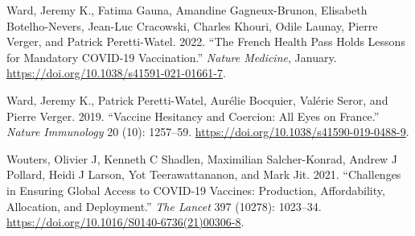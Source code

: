 \documentclass[
]{article}
\newlength{\cslhangindent}
\newlength{\cslentryspacingunit} %
\newenvironment{CSLReferences}[2] %
 {%
  \setlength{\parindent}{0pt}
  \ifodd #1
  \let\oldpar\par
  \def\par{\hangindent=\cslhangindent\oldpar}
  \fi
  \setlength{\parskip}{#2\cslentryspacingunit}
 }%
 {}
\begin{document}
\begin{CSLReferences}{1}{0}
\leavevmode{}%
Ward, Jeremy K., Fatima Gauna, Amandine Gagneux-Brunon, Elisabeth Botelho-Nevers, Jean-Luc Cracowski, Charles Khouri, Odile Launay, Pierre Verger, and Patrick Peretti-Watel. 2022. {``The {French} Health Pass Holds Lessons for Mandatory {COVID-19} Vaccination.''} \emph{Nature Medicine}, January. \url{https://doi.org/10.1038/s41591-021-01661-7}.

\leavevmode{}%
Ward, Jeremy K., Patrick Peretti-Watel, Aurélie Bocquier, Valérie Seror, and Pierre Verger. 2019. {``Vaccine Hesitancy and Coercion: All Eyes on {France}.''} \emph{Nature Immunology} 20 (10): 1257--59. \url{https://doi.org/10.1038/s41590-019-0488-9}.

\leavevmode{}%
Wouters, Olivier J, Kenneth C Shadlen, Maximilian Salcher-Konrad, Andrew J Pollard, Heidi J Larson, Yot Teerawattananon, and Mark Jit. 2021. {``Challenges in Ensuring Global Access to {COVID-19} Vaccines: Production, Affordability, Allocation, and Deployment.''} \emph{The Lancet} 397 (10278): 1023--34. \url{https://doi.org/10.1016/S0140-6736(21)00306-8}.

\end{CSLReferences}
\end{document}
